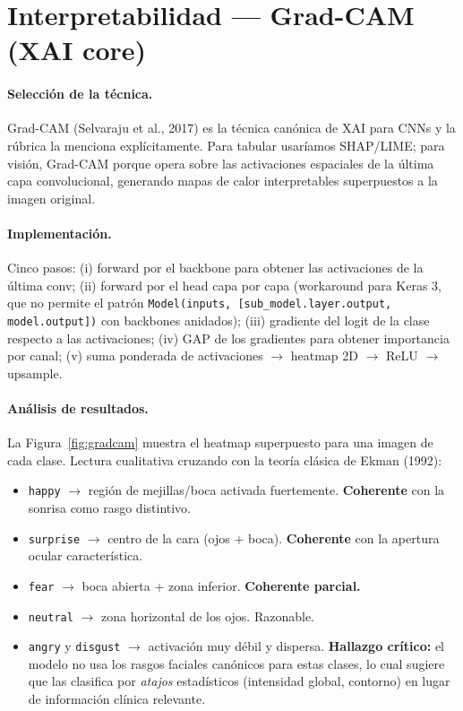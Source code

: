 \documentclass[10pt,a4paper,twocolumn]{article}
\begin{document}
\section{Interpretabilidad — Grad-CAM (XAI core)}

\paragraph{Selección de la técnica.} Grad-CAM (Selvaraju et al., 2017) es la técnica canónica de XAI para CNNs y la rúbrica la menciona explícitamente. Para tabular usaríamos SHAP/LIME; para visión, Grad-CAM porque opera sobre las activaciones espaciales de la última capa convolucional, generando mapas de calor interpretables superpuestos a la imagen original.

\paragraph{Implementación.} Cinco pasos: (i) forward por el backbone para obtener las activaciones de la última conv; (ii) forward por el head capa por capa (workaround para Keras 3, que no permite el patrón \texttt{Model(inputs, [sub\_model.layer.output, model.output])} con backbones anidados); (iii) gradiente del logit de la clase respecto a las activaciones; (iv) GAP de los gradientes para obtener importancia por canal; (v) suma ponderada de activaciones $\rightarrow$ heatmap 2D $\rightarrow$ ReLU $\rightarrow$ upsample.

\paragraph{Análisis de resultados.} La Figura~\ref{fig:gradcam} muestra el heatmap superpuesto para una imagen de cada clase. Lectura cualitativa cruzando con la teoría clásica de Ekman (1992):

\begin{itemize}
    \item \texttt{happy} $\rightarrow$ región de mejillas/boca activada fuertemente. \textbf{Coherente} con la sonrisa como rasgo distintivo.
    \item \texttt{surprise} $\rightarrow$ centro de la cara (ojos + boca). \textbf{Coherente} con la apertura ocular característica.
    \item \texttt{fear} $\rightarrow$ boca abierta + zona inferior. \textbf{Coherente parcial.}
    \item \texttt{neutral} $\rightarrow$ zona horizontal de los ojos. Razonable.
    \item \texttt{angry} y \texttt{disgust} $\rightarrow$ activación muy débil y dispersa. \textbf{Hallazgo crítico:} el modelo no usa los rasgos faciales canónicos para estas clases, lo cual sugiere que las clasifica por \textit{atajos} estadísticos (intensidad global, contorno) en lugar de información clínica relevante.
\end{itemize}
\end{document}
